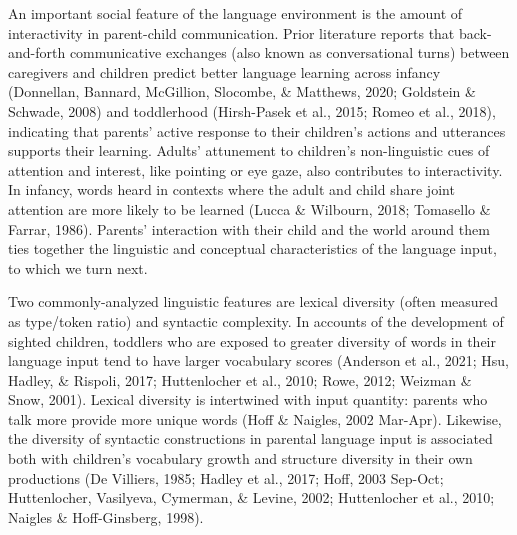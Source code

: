 \documentclass[
  man,floatsintext]{apa6}
\begin{document}
An important social feature of the language environment is the amount of interactivity in parent-child communication. Prior literature reports that back-and-forth communicative exchanges (also known as conversational turns) between caregivers and children predict better language learning across infancy (Donnellan, Bannard, McGillion, Slocombe, \& Matthews, 2020; Goldstein \& Schwade, 2008) and toddlerhood (Hirsh-Pasek et al., 2015; Romeo et al., 2018), indicating that parents' active response to their children's actions and utterances supports their learning. Adults' attunement to children's non-linguistic cues of attention and interest, like pointing or eye gaze, also contributes to interactivity. In infancy, words heard in contexts where the adult and child share joint attention are more likely to be learned (Lucca \& Wilbourn, 2018; Tomasello \& Farrar, 1986). Parents' interaction with their child and the world around them ties together the linguistic and conceptual characteristics of the language input, to which we turn next.

Two commonly-analyzed linguistic features are lexical diversity (often measured as type/token ratio) and syntactic complexity. In accounts of the development of sighted children, toddlers who are exposed to greater diversity of words in their language input tend to have larger vocabulary scores (Anderson et al., 2021; Hsu, Hadley, \& Rispoli, 2017; Huttenlocher et al., 2010; Rowe, 2012; Weizman \& Snow, 2001). Lexical diversity is intertwined with input quantity: parents who talk more provide more unique words (Hoff \& Naigles, 2002 Mar-Apr). Likewise, the diversity of syntactic constructions in parental language input is associated both with children's vocabulary growth and structure diversity in their own productions (De Villiers, 1985; Hadley et al., 2017; Hoff, 2003 Sep-Oct; Huttenlocher, Vasilyeva, Cymerman, \& Levine, 2002; Huttenlocher et al., 2010; Naigles \& Hoff-Ginsberg, 1998).
\end{document}
